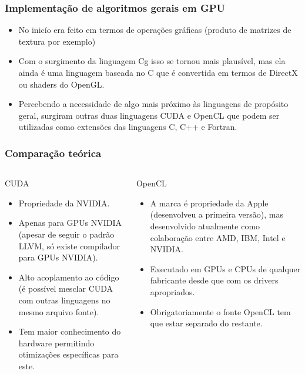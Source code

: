 \documentclass[brazil]{beamer}
\begin{document}
\begin{frame}
  \frametitle{Implementação de algoritmos gerais em GPU}
  \begin{itemize}
    \item No inicío era feito em termos de operações gráficas (produto de matrizes de textura por exemplo)
    \item Com o surgimento da linguagem Cg isso se tornou mais plausível, mas ela ainda é uma linguagem baseada no C que é convertida em termos de DirectX ou shaders do OpenGL.
    \item Percebendo a necessidade de algo mais próximo às linguagens de propósito geral, surgiram outras duas linguagens CUDA e OpenCL que podem ser utilizadas como extensões das linguagens C, C++ e Fortran.
  \end{itemize}
\end{frame}

\begin{frame}
  \frametitle{Comparação teórica}

\begin{columns}
  \begin{column}{.5\textwidth}
    CUDA
    
    \begin{itemize}
      \item Propriedade da NVIDIA.
      \item Apenas para GPUs NVIDIA (apesar de seguir o padrão LLVM, só existe compilador para GPUs NVIDIA).
      \item Alto acoplamento ao código (é possível mesclar CUDA com outras linguagens no mesmo arquivo fonte).
      \item Tem maior conhecimento do hardware permitindo otimizações específicas para este.
    \end{itemize}
  \end{column}
  \begin{column}{.5\textwidth}
    OpenCL    
    
    \begin{itemize}
      \item A marca é propriedade da Apple (desenvolveu a primeira versão), mas desenvolvido atualmente como colaboração entre AMD, IBM, Intel e NVIDIA.
      \item Executado em GPUs e CPUs de qualquer fabricante desde que com os drivers apropriados.
      \item Obrigatoriamente o fonte OpenCL tem que estar separado do restante.
    \end{itemize}
  \end{column}
\end{columns}
\end{frame}
\end{document}
